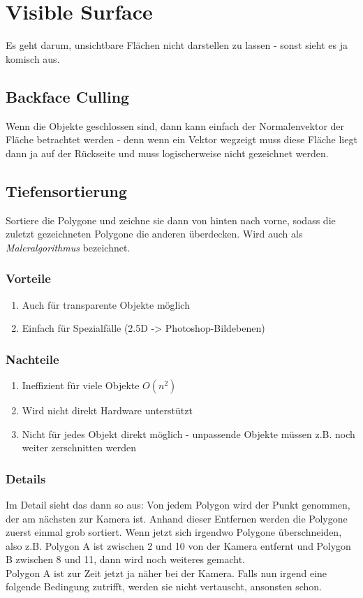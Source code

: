 \chapter{Visible Surface}
Es geht darum, unsichtbare Flächen nicht darstellen zu lassen - sonst sieht es ja komisch aus.

\section{Backface Culling}
Wenn die Objekte geschlossen sind, dann kann einfach der Normalenvektor der Fläche betrachtet werden - denn wenn ein Vektor wegzeigt muss diese Fläche liegt dann ja auf der Rückseite und muss logischerweise nicht gezeichnet werden.

\section{Tiefensortierung}
Sortiere die Polygone und zeichne sie dann von hinten nach vorne, sodass die zuletzt gezeichneten Polygone die anderen überdecken. Wird auch als \textit{Maleralgorithmus} bezeichnet.
\subsection{Vorteile}
\begin{enumerate}
	\item Auch für transparente Objekte möglich
	\item Einfach für Spezialfälle (2.5D -> Photoshop-Bildebenen)
\end{enumerate}
\subsection{Nachteile}
\begin{enumerate}
	\item Ineffizient für viele Objekte \(O(n^2)\)
	\item Wird nicht direkt Hardware unterstützt
	\item Nicht für jedes Objekt direkt möglich - unpassende Objekte  müssen z.B. noch weiter zerschnitten werden
\end{enumerate}
\subsection{Details}
Im Detail sieht das dann so aus:
Von jedem Polygon wird der Punkt genommen, der am nächsten zur Kamera ist. Anhand dieser Entfernen werden die Polygone zuerst einmal grob sortiert. Wenn jetzt sich irgendwo Polygone überschneiden, also z.B. Polygon A ist zwischen 2 und 10 von der Kamera entfernt und Polygon B zwischen 8 und 11, dann wird noch weiteres gemacht.\\
Polygon A ist zur Zeit jetzt ja näher bei der Kamera. Falls nun irgend eine folgende Bedingung zutrifft, werden sie nicht vertauscht, ansonsten schon.

